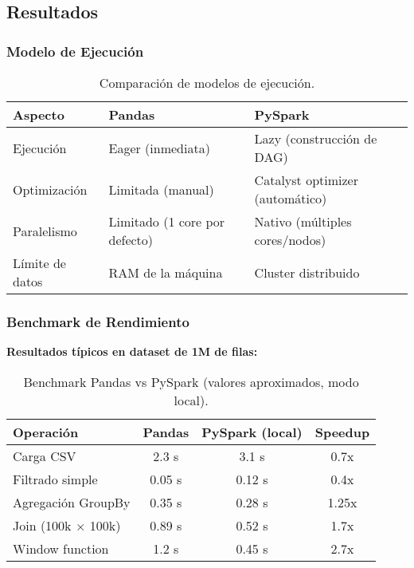 \documentclass[12pt]{src/formato_utem}
\begin{document}
\subsection{Resultados}

\subsubsection{Modelo de Ejecución}

\begin{table}[h!]
\centering
\begin{tabular}{|l|p{6cm}|p{6cm}|}
\hline
\textbf{Aspecto} & \textbf{Pandas} & \textbf{PySpark} \\ \hline
Ejecución & Eager (inmediata) & Lazy (construcción de DAG) \\ \hline
Optimización & Limitada (manual) & Catalyst optimizer (automático) \\ \hline
Paralelismo & Limitado (1 core por defecto) & Nativo (múltiples cores/nodos) \\ \hline
Límite de datos & RAM de la máquina & Cluster distribuido \\ \hline
\end{tabular}
\caption{Comparación de modelos de ejecución.}
\label{tab:pandas-pyspark-execution}
\end{table}

\subsubsection{Benchmark de Rendimiento}

\textbf{Resultados típicos en dataset de 1M de filas:}

\begin{table}[h!]
\centering
\begin{tabular}{|l|c|c|c|}
\hline
\textbf{Operación} & \textbf{Pandas} & \textbf{PySpark (local)} & \textbf{Speedup} \\ \hline
Carga CSV & 2.3 s & 3.1 s & 0.7x \\ \hline
Filtrado simple & 0.05 s & 0.12 s & 0.4x \\ \hline
Agregación GroupBy & 0.35 s & 0.28 s & 1.25x \\ \hline
Join (100k $\times$ 100k) & 0.89 s & 0.52 s & 1.7x \\ \hline
Window function & 1.2 s & 0.45 s & 2.7x \\ \hline
\end{tabular}
\caption{Benchmark Pandas vs PySpark (valores aproximados, modo local).}
\label{tab:pandas-pyspark-benchmark}
\end{table}
\end{document}
